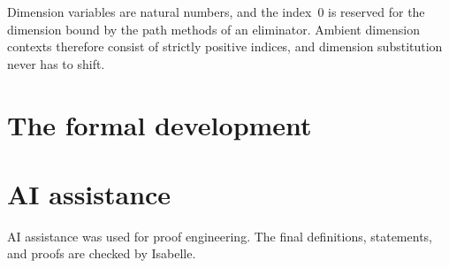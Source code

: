 \documentclass[11pt,a4paper]{article}
\begin{document}
Dimension variables are natural numbers, and the index~$0$ is reserved for the
dimension bound by the path methods of an eliminator. Ambient dimension
contexts therefore consist of strictly positive indices, and dimension
substitution never has to shift.

\section{The formal development}



\section{AI assistance}

AI assistance was used for proof engineering. The final definitions,
statements, and proofs are checked by Isabelle.



\end{document}
